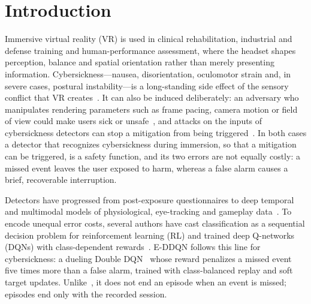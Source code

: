 \section{Introduction}
\label{sec:intro}
Immersive virtual reality (VR) is used in clinical rehabilitation, industrial and defense training and human-performance assessment, where the headset shapes perception, balance and spatial orientation rather than merely presenting information. Cybersickness---nausea, disorientation, oculomotor strain and, in severe cases, postural instability---is a long-standing side effect of the sensory conflict that VR creates~\cite{caserman2021cybersickness}. It can also be induced deliberately: an adversary who manipulates rendering parameters such as frame pacing, camera motion or field of view could make users sick or unsafe~\cite{tseng2022dark,odeleye2021framerate}, and attacks on the inputs of cybersickness detectors can stop a mitigation from being triggered~\cite{kundu2025securing}. In both cases a detector that recognizes cybersickness during immersion, so that a mitigation can be triggered, is a safety function, and its two errors are not equally costly: a missed event leaves the user exposed to harm, whereas a false alarm causes a brief, recoverable interruption.

Detectors have progressed from post-exposure questionnaires to deep temporal and multimodal models of physiological, eye-tracking and gameplay data~\cite{dennison2016physio,islam2020automatic,islam2021fusion,liu2024cnneca,yalcin2024automatic,jeong2024precyse}. To encode unequal error costs, several authors have cast classification as a sequential decision problem for reinforcement learning (RL) and trained deep Q-networks (DQNs) with class-dependent rewards~\cite{lin2020imbalanced,yang2024drlimbalanced}. E-DDQN follows this line for cybersickness: a dueling Double DQN~\cite{vanhasselt2016double,wang2016dueling} whose reward penalizes a missed event five times more than a false alarm, trained with class-balanced replay and soft target updates. Unlike~\cite{lin2020imbalanced,yang2024drlimbalanced}, it does not end an episode when an event is missed; episodes end only with the recorded session.

